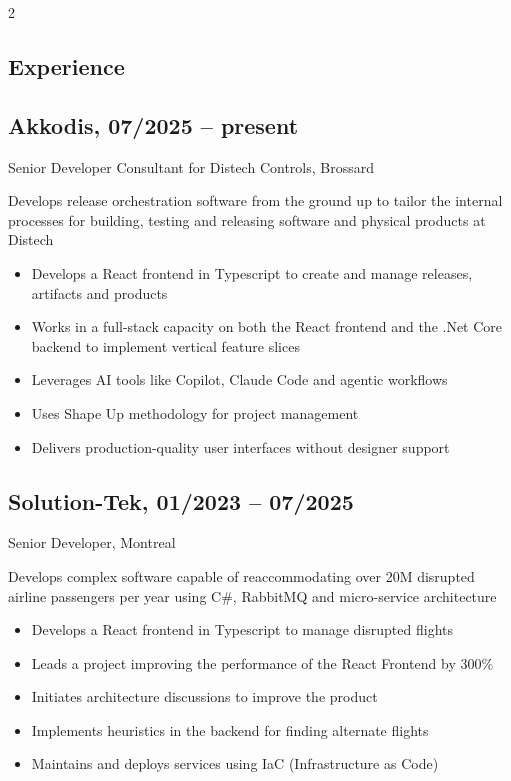 \documentclass{article}
\begin{document}
\begin{paracol}{2}
\begin{rightcolumn}
    \section{Experience}
    
    \subsection{Akkodis, 07/2025 -- present}
    {Senior Developer Consultant for Distech Controls, Brossard\par}
    {
      Develops release orchestration software from the ground up to tailor the internal processes for
      building, testing and releasing software and physical products at Distech
    \par}
    \begin{itemize}
      \item Develops a React frontend in Typescript to create and manage releases, artifacts and products
      \item Works in a full-stack capacity on both the React frontend and the .Net Core backend to implement vertical feature slices
      \item Leverages AI tools like Copilot, Claude Code and agentic workflows
      \item Uses Shape Up methodology for project management
      \item Delivers production-quality user interfaces without designer support
    \end{itemize}

    \vspace{1em}

    \subsection{Solution-Tek, 01/2023 -- 07/2025}
    {Senior Developer, Montreal\par}
    {
      Develops complex software capable of reaccommodating over 20M disrupted airline passengers per year
      using C\#, RabbitMQ and micro-service architecture
    \par}
    \begin{itemize}
      \item Develops a React frontend in Typescript to manage disrupted flights
      \item Leads a project improving the performance of the React Frontend by 300\%
      \item Initiates architecture discussions to improve the product
      \item Implements heuristics in the backend for finding alternate flights
      \item Maintains and deploys services using IaC (Infrastructure as Code)
    \end{itemize}


\end{rightcolumn}
\end{paracol}
\end{document}
